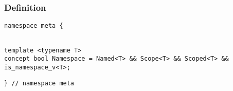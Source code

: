 
\subsubsection{Definition}

\begin{verbatim}
namespace meta {
\end{verbatim}
\begin{verbatim}

template <typename T>
concept bool Namespace = Named<T> && Scope<T> && Scoped<T> && is_namespace_v<T>;

\end{verbatim}
\begin{verbatim}
} // namespace meta
\end{verbatim}
